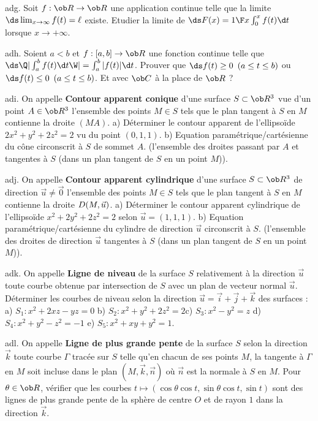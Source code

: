 \exo [Level=2,Fight=1,Learn=1,Field=\FonctionsDéfiniesParUneIntégrale,Type=\Exercices,Origin=] adg. 
Soit $f:\ob R\to\ob R$ une application continue telle que la limite $\ds \lim_{x\to\infty}f(t)=\ell$ existe. \pn 
Etudier la limite de $\ds F(x)={1\F x}\int_0^xf(t)\d t$ lorsque $x\to+\infty$. 
 
\exo [Level=2,Fight=2,Learn=2,Field=\Intégrales,Type=\Exercices,Origin=\MP] adh. 
Soient $a<b$ et $f:[a,b]\to\ob R$ une fonction continue telle que $\ds\Q|\int_a^bf(t)\d t\W|=\int_a^b|f(t)|\d t$. \pn
Prouver que $\ds f(t)\ge0\ \,(a\le t\le b)$ ou $\ds f(t)\le 0\ \,(a\le t\le b)$.  Et avec $\ob C$ à la place de $\ob R$ ?

\exo [Level=2,Fight=3,Learn=2,Field=\Surfaces,Type=\Exercices,Origin=\MP] adi.  
On appelle {\bf Contour apparent conique} d'une surface $S\subset\ob R^3$ 
vue d'un point $A\in\ob R^3$ l'ensemble des points $M\in S$ tels que le plan tangent à $S$ en $M$ contienne la droite $(MA)$. \pn
a) Déterminer le contour apparent de l'ellipsoïde $2x^2+y^2+2z^2=2$ vu du point $(0,1,1)$. \smallskip\noindent
b) Equation paramétrique/cartésienne du cône circonscrit à $S$ de sommet $A$. (l'ensemble des droites passant par $A$ et tangentes à $S$ 
(dans un plan tangent de $S$ en un point $M$)). 

\exo [Level=2,Fight=3,Learn=2,Field=\Surfaces,Type=\Exercices,Origin=\MP] adj. 
On appelle  {\bf Contour apparent cylindrique} d'une surface $S\subset\ob R^3$ 
de direction $\vec u\neq\vec 0$ l'ensemble des points $M\in S$ tels que le plan tangent à $S$ en $M$ 
contienne la droite $\sc D(M,\vec u)$. \smallskip\noindent
a) Déterminer le contour apparent cylindrique de l'ellipsoïde $x^2+2y^2+2z^2=2$ 
selon $\vec u=(1,1,1)$. \pn
b) Equation paramétrique/cartésienne du cylindre de direction $\vec u$ 
circonscrit à $S$. (l'ensemble des droites de direction  $\vec u$ tangentes à $S$ 
(dans un plan tangent de $S$ en un point $M$)). 

\exo [Level=2,Fight=3,Learn=2,Field=\Surfaces,Type=\Exercices,Origin=\MP] adk. 
On appelle {\bf Ligne de niveau} de la surface $S$ relativement à la direction $\vec u$ 
toute courbe obtenue par intersection de $S$ avec un plan de vecteur normal $\vec u$. \pn
Déterminer les courbes de niveau selon la direction $\vec u=\vec i+\vec j+\vec k$ des surfaces : \pn
a)  $S_1: x^2+2xz-yz=0$ \qquad b) $S_2:x^2+y^2+2z^2=2$\qquad c) $S_3: x^2-y^2=z$ \pn
d) $S_4:x^2+y^2-z^2=-1$ \qquad e) $S_5:x^2+xy+y^2=1$.

\exo [Level=2,Fight=3,Learn=2,Field=\Surfaces,Type=\Exercices,Origin=\MP] adl. 
On appelle {\bf Ligne de plus grande pente} de la surface $S$ selon la direction $\vec k$ 
toute courbe $\Gamma$ tracée sur $S$ telle qu'en chacun de ses points $M$, la tangente à $\Gamma$ en $M$ soit incluse dans le plan $(M,\vec k, \vec n)$ 
où $\vec n$ est la normale à $S$ en $M$. \pn
Pour $\theta\in\ob R$, vérifier que les courbes $t\mapsto(\cos\theta\cos t,\sin\theta\cos t,\sin t)$ 
sont des lignes de plus grande pente  de la sphère de centre $O$ et de rayon $1$ dans la direction $\vec k$. 

